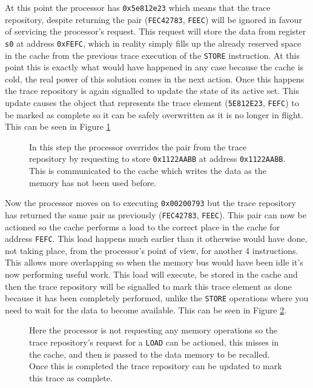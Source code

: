 At this point the processor has \texttt{0x5e812e23} which means that the trace repository, despite returning the pair (\texttt{FEC42783}, \texttt{FEEC}) will be ignored in favour of servicing the processor's request. This request will store the data from register \texttt{s0} at address \texttt{0xFEFC}, which in reality simply fills up the already reserved space in the cache from the previous trace execution of the \texttt{STORE} instruction. At this point this is exactly what would have happened in any case because the cache is cold, the real power of this solution comes in the next action. Once this happens the trace repository is again signalled to update the state of its active set. This update causes the object that represents the trace element (\texttt{5E812E23}, \texttt{FEFC}) to be marked as complete so it can be safely overwritten as it is no longer in flight. This can be seen in Figure \ref{fig:trace-assisted-cache-example-step-3}

\begin{figure}[htbp]
	
	\caption{In this step the processor overrides the pair from the trace repository by requesting to store \texttt{0x1122AABB} at address \texttt{0x1122AABB}. This is communicated to the cache which writes the data as the memory has not been used before.}
	\label{fig:trace-assisted-cache-example-step-3}
\end{figure}

Now the processor moves on to executing \texttt{0x00200793} but the trace repository has returned the same pair as previously (\texttt{FEC42783}, \texttt{FEEC}). This pair can now be actioned so the cache performs a load to the correct place in the cache for address \texttt{FEFC}. This load happens much earlier than it otherwise would have done, not taking place, from the processor's point of view, for another 4 instructions. This allows more overlapping so when the memory bus would have been idle it's now performing useful work. This load will execute, be stored in the cache and then the trace repository will be signalled to mark this trace element as done because it has been completely performed, unlike the \texttt{STORE} operations where you need to wait for the data to become available. This can be seen in Figure \ref{fig:trace-assisted-cache-example-step-4}.

\begin{figure}[htbp]
	
	\caption{Here the processor is not requesting any memory operations so the trace repository's request for a \texttt{LOAD} can be actioned, this misses in the cache, and then is passed to the data memory to be recalled. Once this is completed the trace repository can be updated to mark this trace as complete.}
	\label{fig:trace-assisted-cache-example-step-4}
\end{figure}

